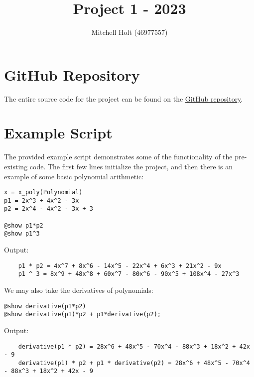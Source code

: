 \documentclass{article}
\title{Project 1 - 2023}
\author{Mitchell Holt (46977557)}
\theoremstyle{plain}
\numberwithin{theorem}{section}
\numberwithin{example}{section}
\theoremstyle{definition}
\numberwithin{definition}{section}
\begin{document}
\maketitle

\tableofcontents

\newpage

\section{GitHub Repository}

The entire source code for the project can be found on the
\href{https://github.com/mitchellholt/Mitchell-Holt-2504-2023-PROJECT1}
{\color{blue}GitHub repository}.


\section{Example Script}
The provided example script demonstrates some of the functionality of the
pre-existing code. The first few lines initialize the project, and then there is
an example of some basic polynomial arithmetic:

\begin{codebox}
    \begin{Verbatim}
x = x_poly(Polynomial)
p1 = 2x^3 + 4x^2 - 3x
p2 = 2x^4 - 4x^2 - 3x + 3

@show p1*p2
@show p1^3
    \end{Verbatim}
\end{codebox}

Output:
\begin{Verbatim}
    p1 * p2 = 4x^7 + 8x^6 - 14x^5 - 22x^4 + 6x^3 + 21x^2 - 9x
    p1 ^ 3 = 8x^9 + 48x^8 + 60x^7 - 80x^6 - 90x^5 + 108x^4 - 27x^3
\end{Verbatim}
We may also take the derivatives of polynomials:

\begin{codebox}
    \begin{Verbatim}
@show derivative(p1*p2)
@show derivative(p1)*p2 + p1*derivative(p2);
    \end{Verbatim}
\end{codebox}

Output:
\begin{Verbatim}
    derivative(p1 * p2) = 28x^6 + 48x^5 - 70x^4 - 88x^3 + 18x^2 + 42x - 9
    derivative(p1) * p2 + p1 * derivative(p2) = 28x^6 + 48x^5 - 70x^4 - 88x^3 + 18x^2 + 42x - 9
\end{Verbatim}
\end{document}
